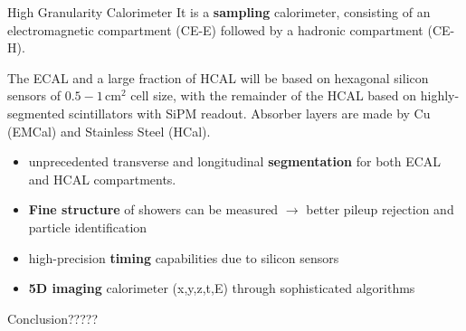 \documentclass[10pt]{beamer}
\begin{document}
\begin{frame}{High Granularity Calorimeter}
    It is a \textbf{sampling} calorimeter, consisting of an electromagnetic compartment (CE-E) followed by a hadronic compartment (CE-H).
    
    The ECAL and a large fraction of HCAL will be based on hexagonal silicon sensors of $0.5 - 1\,\text{cm}^2$ cell size, with the remainder of the HCAL based on highly-segmented scintillators with SiPM readout.
    Absorber layers are made by Cu (EMCal) and Stainless Steel (HCal).

    \begin{itemize}
        \item unprecedented transverse and longitudinal \textbf{segmentation} for both ECAL and HCAL compartments. 
        \item \textbf{Fine structure} of showers can be measured $\rightarrow$ better pileup rejection and particle identification
        \item high-precision \textbf{timing} capabilities due to silicon sensors
        \item \textbf{5D imaging} calorimeter (x,y,z,t,E) through sophisticated algorithms 
    \end{itemize}{}
\end{frame}

\begin{frame}{Conclusion?????}
\end{frame}
 
\end{document}
